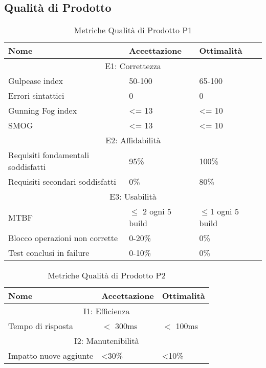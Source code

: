 \subsection{Qualità di Prodotto}
\begin{table}[!htpb]
	\centering
	\renewcommand{\arraystretch}{2} 
	\begin{tabular}{|p{8cm}|p{3.5cm}|p{3.5cm}|}
		\rowcolor{orange!50}
		\hline
		\textbf{Nome} & \textbf{Accettazione} & \textbf{Ottimalità} \\ 
		\hline
		\multicolumn{3}{|c|}{E1: Correttezza}\\
		\hline
		Gulpease index & 50-100 & 65-100 \\ \hline
		Errori sintattici & 0 & 0 \\ \hline
		Gunning Fog index & \textless= 13 & \textless= 10 \\ \hline
		SMOG & \textless= 13 & \textless= 10 \\ \hline
	    \multicolumn{3}{|c|}{E2: Affidabilità} \\
		\hline
		Requisiti fondamentali soddisfatti & 95\% & 100\% \\ \hline
		Requisiti secondari soddisfatti & 0\% & 80\% \\ \hline
	    \multicolumn{3}{|c|}{E3: Usabilità} \\
		\hline
		MTBF & $\leq$ 2 ogni 5 build & $\leq$1 ogni 5 build \\ \hline
		Blocco operazioni non corrette & 0-20\% & 0\% \\ \hline
		Test conclusi in failure & 0-10\% & 0\% \\ \hline
	\end{tabular}
	\caption{Metriche Qualità di Prodotto P1}
\end{table}	        
\begin{table}[!htpb]
	\centering
	\renewcommand{\arraystretch}{2} 
	\begin{tabular}{|p{8cm}|p{3.5cm}|p{3.5cm}|}
		\rowcolor{orange!50}
		\hline
		\textbf{Nome} & \textbf{Accettazione} & \textbf{Ottimalità} \\ 
		\hline
        \multicolumn{3}{|c|}{I1: Efficienza} \\
		\hline
		Tempo di risposta & $<$ 300ms & $<$ 100ms \\ \hline 
	    \multicolumn{3}{|c|}{I2: Manutenibilità} \\
		\hline
		Impatto nuove aggiunte & <30\% & <10\% \\ \hline 
	\end{tabular}
	\caption{Metriche Qualità di Prodotto P2}
\end{table}
